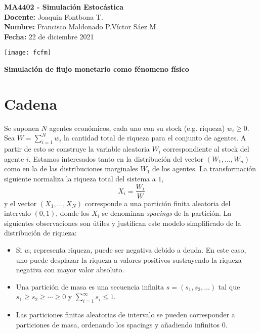 \documentclass[10pt]{article}
\theoremstyle{plain}
\theoremstyle{definition}
\newcommand{\ramo}{MA4402 - Simulación Estocástica} %
\newcommand{\profe}{Joaquin Fontbona T.}%
\newcommand{\nmbrA}{Francisco Maldonado P.}%
\newcommand{\nmbrB}{Víctor Sáez M.}    %
\newcommand{\nmbrC}{}    %
\newcommand{\fecha}{22 de diciembre 2021}%
\newcommand{\titu}{Simulación de flujo monetario como fénomeno físico } %
\begin{document}
\pagestyle{empty}
\vspace*{-1.2 cm}
\begin{minipage}{0.6\textwidth}
\begin{flushleft}
\hspace*{-0.5cm}\textbf{\ramo}\\
\hspace*{-0.5cm}\textbf{Docente:} \profe\\
\hspace*{-0.5cm}\textbf{Nombre:} \nmbrA\quad \nmbrB\quad \nmbrC
\\
\hspace*{-0.5cm}\textbf{Fecha:} \fecha\\
\smallskip
\end{flushleft}
\end{minipage}
\begin{minipage}{0.36\textwidth}
\begin{flushright}
\texttt{[image: fcfm]}
\end{flushright}
\end{minipage}
\bigskip

\begin{center}
\Huge\textbf{\titu}
\end{center}
\bigskip

\section{Cadena}

Se suponen $N$ agentes económicos, cada uno con su stock (e.g. riqueza) $w_{i}\geq 0 $. Sea $W = \sum\limits_{i=1}^{N} w_{i}$ la  cantidad total de riqueza para el conjunto de agentes. 
A partir de esto se construye la variable aleatoria $W_{i}$ correspondiente al stock  del agente $i$. Estamos interesados tanto en la distribución del vector $(W_{1},...,W_{n})$ como en la de las distribuciones marginales $W_{1}$ de los agentes.
La transformación siguiente normaliza la riqueza total del sistema a $1$, \[
X_{i}=\frac{W_{i}}{W}
\]
y el vector $(X_{1},...,X_{N})$ corresponde a una partición finita aleatoria del intervalo $(0,1)$, donde los  $X_{i}$ se denominan {\sl spacings} de la partición.
La siguientes observaciones son útiles y justifican este modelo simplificado de la distribución de riqueza:
\begin{itemize}
    \item Si $w_{i}$ representa riqueza, puede ser negativa debido a deuda. En este caso, uno puede desplazar la riqueza a valores positivos sustrayendo la riqueza negativa con mayor valor absoluto.
    \item  Una partición de masa es una secuencia infinita $s=(s_{1},s_{2},...)$ tal que $s_{1}\geq s_{2}\geq\cdots \geq 0$ y $\sum\limits_{i=1}^{\infty} s_{i}\leq 1$.
    \item Las particiones finitas aleatorias de intervalo se pueden corresponder a particiones de masa, ordenando los spacings y añadiendo infinitos $0$.\\
\end{itemize}
\end{document}
